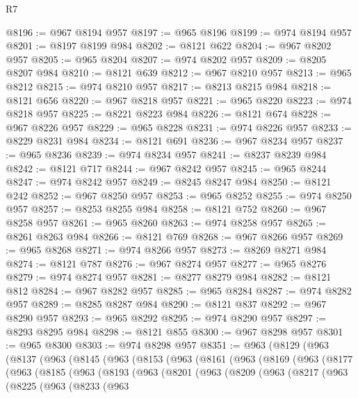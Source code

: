 \begin{lexlean}{R7}
\begin{coremodule}
@8196 := @967 @8194 @957
@8197 := @965 @8196
@8199 := @974 @8194 @957
@8201 := @8197 @8199 @984
@8202 := @8121 @622
@8204 := @967 @8202 @957
@8205 := @965 @8204
@8207 := @974 @8202 @957
@8209 := @8205 @8207 @984
@8210 := @8121 @639
@8212 := @967 @8210 @957
@8213 := @965 @8212
@8215 := @974 @8210 @957
@8217 := @8213 @8215 @984
@8218 := @8121 @656
@8220 := @967 @8218 @957
@8221 := @965 @8220
@8223 := @974 @8218 @957
@8225 := @8221 @8223 @984
@8226 := @8121 @674
@8228 := @967 @8226 @957
@8229 := @965 @8228
@8231 := @974 @8226 @957
@8233 := @8229 @8231 @984
@8234 := @8121 @691
@8236 := @967 @8234 @957
@8237 := @965 @8236
@8239 := @974 @8234 @957
@8241 := @8237 @8239 @984
@8242 := @8121 @717
@8244 := @967 @8242 @957
@8245 := @965 @8244
@8247 := @974 @8242 @957
@8249 := @8245 @8247 @984
@8250 := @8121 @242
@8252 := @967 @8250 @957
@8253 := @965 @8252
@8255 := @974 @8250 @957
@8257 := @8253 @8255 @984
@8258 := @8121 @752
@8260 := @967 @8258 @957
@8261 := @965 @8260
@8263 := @974 @8258 @957
@8265 := @8261 @8263 @984
@8266 := @8121 @769
@8268 := @967 @8266 @957
@8269 := @965 @8268
@8271 := @974 @8266 @957
@8273 := @8269 @8271 @984
@8274 := @8121 @787
@8276 := @967 @8274 @957
@8277 := @965 @8276
@8279 := @974 @8274 @957
@8281 := @8277 @8279 @984
@8282 := @8121 @812
@8284 := @967 @8282 @957
@8285 := @965 @8284
@8287 := @974 @8282 @957
@8289 := @8285 @8287 @984
@8290 := @8121 @837
@8292 := @967 @8290 @957
@8293 := @965 @8292
@8295 := @974 @8290 @957
@8297 := @8293 @8295 @984
@8298 := @8121 @855
@8300 := @967 @8298 @957
@8301 := @965 @8300
@8303 := @974 @8298 @957
@8351 := @963
    (@8129
      (@963
        (@8137
          (@963
            (@8145
              (@963
                (@8153
                  (@963
                    (@8161
                      (@963
                        (@8169
                          (@963
                            (@8177
                              (@963
                                (@8185
                                  (@963
                                    (@8193
                                      (@963
                                        (@8201
                                          (@963
                                            (@8209
                                              (@963
                                                (@8217
                                                  (@963
                                                    (@8225
                                                      (@963
                                                        (@8233
                                                          (@963

\end{coremodule}
\end{lexlean}
